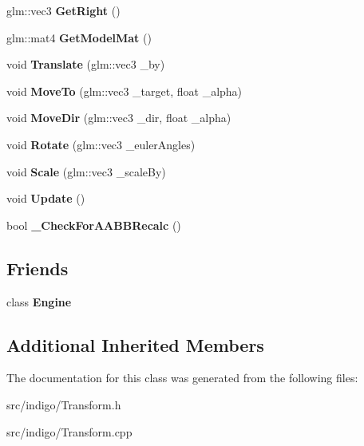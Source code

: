 \begin{DoxyCompactItemize}
glm\+::vec3 {\bfseries Get\+Right} ()
\item 
\mbox{\label{class_indigo_1_1_transform_ad4d433d8ecad0eb730be4294c57938db}} 
glm\+::mat4 {\bfseries Get\+Model\+Mat} ()
\item 
\mbox{\label{class_indigo_1_1_transform_a2b3b2d50122bf966469832d5fc361834}} 
void {\bfseries Translate} (glm\+::vec3 \+\_\+by)
\item 
\mbox{\label{class_indigo_1_1_transform_a78633ea6630bd3ce493529ff122354e6}} 
void {\bfseries Move\+To} (glm\+::vec3 \+\_\+target, float \+\_\+alpha)
\item 
\mbox{\label{class_indigo_1_1_transform_a0d837c0a1d80c8e249e854c584b4b728}} 
void {\bfseries Move\+Dir} (glm\+::vec3 \+\_\+dir, float \+\_\+alpha)
\item 
\mbox{\label{class_indigo_1_1_transform_a41b24ff268187636f66dfa65432bda3a}} 
void {\bfseries Rotate} (glm\+::vec3 \+\_\+euler\+Angles)
\item 
\mbox{\label{class_indigo_1_1_transform_abb94f1c5b70ed256da1629130d680dee}} 
void {\bfseries Scale} (glm\+::vec3 \+\_\+scale\+By)
\item 
\mbox{\label{class_indigo_1_1_transform_a3256c0fb53d0b341ad8d80fe61e5fb2d}} 
void {\bfseries Update} ()
\item 
\mbox{\label{class_indigo_1_1_transform_ae62954b4df267cc4c7a1a837e1f9e5c0}} 
bool {\bfseries \+\_\+\+Check\+For\+A\+A\+B\+B\+Recalc} ()
\end{DoxyCompactItemize}
\subsection*{Friends}
\begin{DoxyCompactItemize}
\item 
\mbox{\label{class_indigo_1_1_transform_a3e1914489e4bed4f9f23cdeab34a43dc}} 
class {\bfseries Engine}
\end{DoxyCompactItemize}
\subsection*{Additional Inherited Members}


The documentation for this class was generated from the following files\+:\begin{DoxyCompactItemize}
\item 
src/indigo/Transform.\+h\item 
src/indigo/Transform.\+cpp\end{DoxyCompactItemize}

